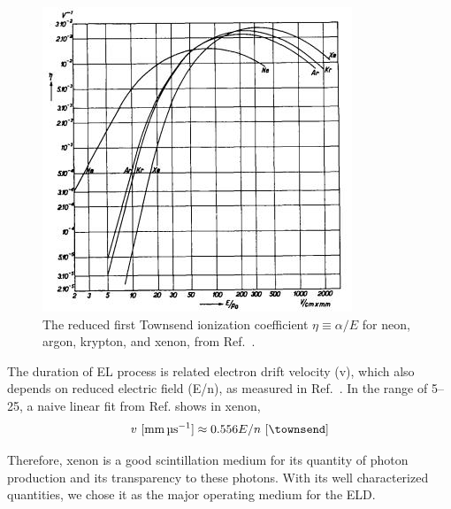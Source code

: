 \begin{figure}[!p]
	\centering
	\includegraphics[width=\figurewidth,clip,trim={0 0 0 0},angle=0,origin=c]{Figures/GasTest/XenonPhysicsUseful/FirstTownsendCoefficientKruithof1960.jpg}
	\caption[The reduced first Townsend ionization coefficient $\eta \equiv \alpha / E$ for neon, argon, krypton, and xenon.]{The reduced first Townsend ionization coefficient $\eta \equiv \alpha / E$ for neon, argon, krypton, and xenon, from Ref.~\cite{Kruithof1940}.}
	\label{fig:first Townsend}
\end{figure}

The duration of EL process is related electron drift velocity (v), which also depends on reduced electric field (E/n), as measured in Ref.~\cite{English1953, Bowe1960, Pack1962, Brooks1982, Berghofer2004}. In the range of \SIrange{5}{25}{\townsend},  a naive linear fit from Ref.\cite{Brooks1982} shows in xenon, 
\begin{align}
v\ [\si{\mm\per\us}] \approx 0.556 E/n\ [\si{\townsend}] \label{eqn:xenon electron drift velocity}
\end{align}


Therefore, xenon is a good scintillation medium for its quantity of photon production and its transparency to these photons. With its well characterized quantities, we chose it as the major operating medium for the ELD.




